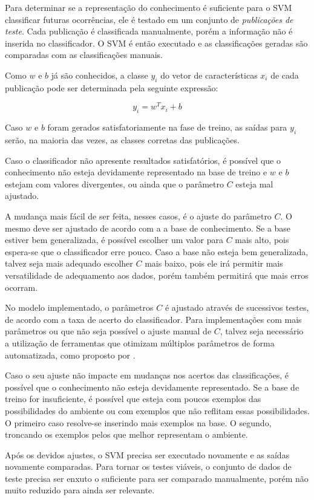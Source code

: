 Para determinar se a representação do conhecimento é suficiente para o SVM classificar futuras ocorrências, ele é testado em um conjunto de \textit{publicações de teste}. Cada publicação é classificada manualmente, porém a informação não é inserida no classificador. O SVM é então executado e as classificações geradas são comparadas com as classificações manuais.

Como $w$ e $b$ já são conhecidos, a classe $y_i$ do vetor de características $x_i$ de cada publicação pode ser determinada pela seguinte expressão:

\begin{equation}
{y}_{i} = {w}^{T}{x}_{i} + b
\end{equation}

Caso $w$ e $b$ foram gerados satisfatoriamente na fase de treino, as saídas para $y_i$ serão, na maioria das vezes, as classes corretas das publicações.

Caso o classificador não apresente resultados satisfatórios, é possível que o conhecimento não esteja devidamente representado na base de treino e $w$ e $b$ estejam com valores divergentes, ou ainda que o parâmetro $C$ esteja mal ajustado.

A mudança mais fácil de ser feita, nesses casos, é o ajuste do parâmetro $C$. O mesmo deve ser ajustado de acordo com a a base de conhecimento. Se a base estiver bem generalizada, é possível escolher um valor para $C$ mais alto, pois espera-se que o classificador erre pouco. Caso a base não esteja bem generalizada, talvez seja mais adequado escolher $C$ mais baixo, pois ele irá permitir mais versatilidade de adequamento aos dados, porém também permitirá que mais erros ocorram. 

No modelo implementado, o parâmetros $C$ é ajustado através de sucessivos testes, de acordo com a taxa de acerto do classificador. Para implementações com mais parâmetros ou que não seja possível o ajuste manual de $C$, talvez seja necessário a utilização de ferramentas que otimizam múltiplos parâmetros de forma automatizada, como proposto por .

Caso o seu ajuste não impacte em mudanças nos acertos das classificações, é possível que o conhecimento não esteja devidamente representado. Se a base de treino for insuficiente, é possível que esteja com poucos exemplos das possibilidades do ambiente ou com exemplos que não reflitam essas possibilidades. O primeiro caso resolve-se inserindo mais exemplos na base. O segundo, troncando os exemplos pelos que melhor representam o ambiente.

Após os devidos ajustes, o SVM precisa ser executado novamente e as saídas novamente comparadas. Para tornar os testes viáveis, o conjunto de dados de teste precisa ser enxuto o suficiente para ser comparado manualmente, porém não muito reduzido para ainda ser relevante. 